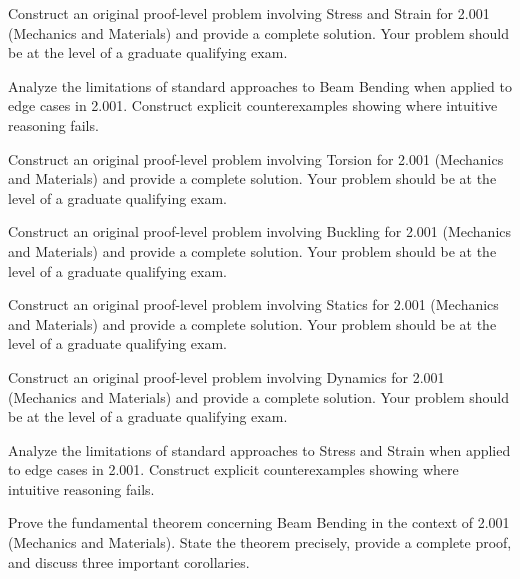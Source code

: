 \documentclass[12pt,a4paper]{exam}
\begin{document}
\begin{questions}
\vspace{0.3cm}

\question[2]
Construct an original proof-level problem involving Stress and Strain for 2.001 (Mechanics and Materials) and provide a complete solution. Your problem should be at the level of a graduate qualifying exam.

\vspace{0.3cm}

\question[2]
Analyze the limitations of standard approaches to Beam Bending when applied to edge cases in 2.001. Construct explicit counterexamples showing where intuitive reasoning fails.

\vspace{0.3cm}

\question[5]
Construct an original proof-level problem involving Torsion for 2.001 (Mechanics and Materials) and provide a complete solution. Your problem should be at the level of a graduate qualifying exam.

\vspace{0.3cm}

\question[7]
Construct an original proof-level problem involving Buckling for 2.001 (Mechanics and Materials) and provide a complete solution. Your problem should be at the level of a graduate qualifying exam.

\vspace{0.3cm}

\question[4]
Construct an original proof-level problem involving Statics for 2.001 (Mechanics and Materials) and provide a complete solution. Your problem should be at the level of a graduate qualifying exam.

\vspace{0.3cm}

\question[6]
Construct an original proof-level problem involving Dynamics for 2.001 (Mechanics and Materials) and provide a complete solution. Your problem should be at the level of a graduate qualifying exam.

\vspace{0.3cm}

\question[2]
Analyze the limitations of standard approaches to Stress and Strain when applied to edge cases in 2.001. Construct explicit counterexamples showing where intuitive reasoning fails.

\vspace{0.3cm}

\question[3]
Prove the fundamental theorem concerning Beam Bending in the context of 2.001 (Mechanics and Materials). State the theorem precisely, provide a complete proof, and discuss three important corollaries.


\end{questions}
\end{document}
